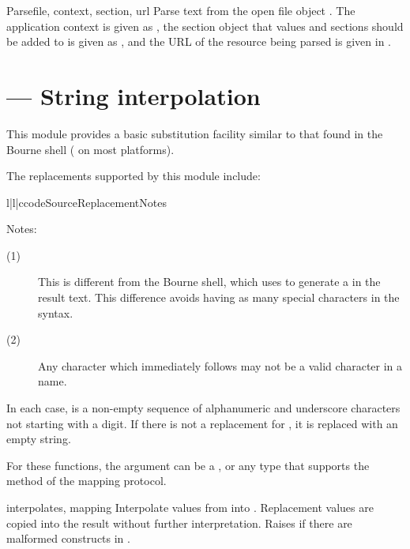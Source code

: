 \documentclass{howto}
\begin{document}
\begin{funcdesc}{Parse}{file, context, section, url}
  Parse text from the open file object .  The application
  context is given as , the section object that values
  and sections should be added to is given as , and the
  URL of the resource being parsed is given in .
\end{funcdesc}


\section{ --- String interpolation}


This module provides a basic substitution facility similar to that
found in the Bourne shell ( on most \UNIX{} platforms).  

The replacements supported by this module include:

\begin{tableiii}{l|l|c}{code}{Source}{Replacement}{Notes}
\end{tableiii}

\noindent
Notes:
\begin{description}
  \item[(1)]  This is different from the Bourne shell, which uses
              \code{\textbackslash\$} to generate a \character{\$} in
              the result text.  This difference avoids having as many
              special characters in the syntax.

  \item[(2)]  Any character which immediately follows  may
              not be a valid character in a name.
\end{description}

In each case,  is a non-empty sequence of alphanumeric and
underscore characters not starting with a digit.  If there is not
a replacement for , it is replaced with an empty string.

For these functions, the  argument can be a ,
or any type that supports the  method of the mapping
protocol.

\begin{funcdesc}{interpolate}{s, mapping}
  Interpolate values from  into .  Replacement
  values are copied into the result without further interpretation.
  Raises  if there are malformed
  constructs in .
\end{funcdesc}
\end{document}
